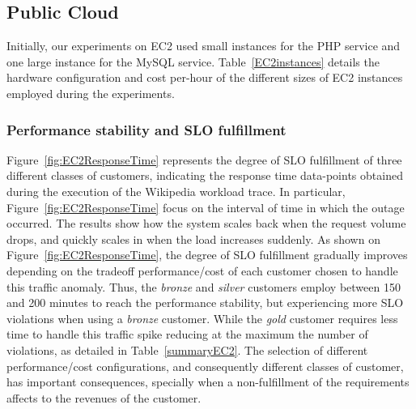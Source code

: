 

\subsection{Public Cloud}

Initially, our experiments on EC2 used small instances for the PHP service and one large instance for the MySQL service. Table~\ref{EC2instances} details the hardware configuration and cost per-hour of the different sizes of EC2 instances employed during the experiments.




\subsubsection{Performance stability and SLO fulfillment} 
Figure~\ref{fig:EC2ResponseTime} represents the degree of SLO fulfillment of three different classes of customers, indicating the response time data-points obtained during the execution of the Wikipedia workload trace. In particular, Figure~\ref{fig:EC2ResponseTime} focus on the interval of time in which the outage occurred. The results show how the system scales back when the request volume drops, and quickly scales in when the load increases suddenly. As shown on Figure~\ref{fig:EC2ResponseTime},  the degree of SLO fulfillment gradually improves depending on the tradeoff performance/cost of each customer chosen to handle this traffic anomaly. Thus, the \emph{bronze} and \emph{silver} customers employ between 150 and 200 minutes to reach the performance stability,  but experiencing more SLO violations when using a \emph{bronze} customer. While the \emph{gold} customer requires less time to handle this traffic spike reducing at the maximum the number of violations, as detailed in Table~\ref{summaryEC2}. The selection of different performance/cost configurations, and consequently different classes of customer, has important consequences, specially when a non-fulfillment of the requirements affects to the revenues of the customer.

